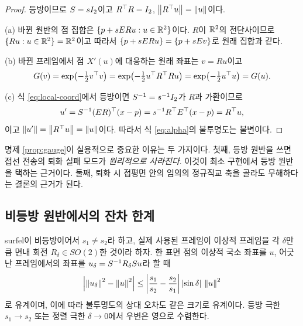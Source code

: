 \begin{proof}
등방이므로 $S = sI_2$이고 $R^{\top} R = I_2$, $\left\lVert R^{\top} u \right\rVert=\left\lVert u \right\rVert$이다.

(a) 바뀐 원반의 점 집합은 $\{p + sE R u : u\in\mathbb{R}^2\}$이다. $R$이
$\mathbb{R}^2$의 전단사이므로 $\{Ru : u\in\mathbb{R}^2\} = \mathbb{R}^2$이고 따라서
$\{p+sE Ru\} = \{p+sE v\}$로 원래 집합과 같다.

(b) 바뀐 프레임에서 점 $X'(u)$에 대응하는 원래 좌표는 $v = Ru$이고
\[
  G(v) = \exp\bigl(-\tfrac12 v^{\top} v\bigr)
  = \exp\bigl(-\tfrac12 u^{\top} R^{\top} R u\bigr)
  = \exp\bigl(-\tfrac12 u^{\top} u\bigr) = G(u).
\]

(c) 식 \eqref{eq:local-coord}에서 등방이면 $S^{-1}=s^{-1}I_2$가 $R$과 가환이므로
\[
  u' = S^{-1}(E R)^{\top}(x-p)
     = s^{-1}R^{\top} E^{\top}(x-p) = R^{\top} u,
\]
이고 $\left\lVert u' \right\rVert=\left\lVert R^{\top} u \right\rVert=\left\lVert u \right\rVert$이다. 따라서 식 \eqref{eq:alpha}의
불투명도는 불변이다.
\end{proof}

명제 \ref{prop:gauge}이 실용적으로 중요한 이유는 두 가지이다. 첫째, 등방 원반을 쓰면
접선 전송의 퇴화 실패 모드가 \emph{원리적으로 사라진다}. 이것이 최소 구현에서 등방
원반을 택하는 근거이다. 둘째, 퇴화 시 접평면 안의 임의의 정규직교 축을 골라도
무해하다는 결론의 근거가 된다.

\subsection{비등방 원반에서의 잔차 한계}

\begin{proposition}
\label{prop:aniso}
surfel이 비등방이어서 $s_1\ne s_2$라 하고, 실제 사용된 프레임이 이상적 프레임을 각
$\delta$만큼 면내 회전 $R_\delta\in SO(2)$한 것이라 하자. 한 표면 점의 이상적 국소
좌표를 $u$, 어긋난 프레임에서의 좌표를 $u_\delta = S^{-1}R_\delta S u$라
할 때
\begin{equation}
  \Bigl\lvert \left\lVert u_\delta \right\rVert^2 - \left\lVert u \right\rVert^2 \Bigr\rvert
  \le \left\lvert \frac{s_1}{s_2}-\frac{s_2}{s_1}\right\rvert \left\lvert \sin\delta \right\rvert\,\left\lVert u \right\rVert^2
  \label{eq:aniso-bound}
\end{equation}
로 유계이며, 이에 따라 불투명도의 상대 오차도 같은 크기로 유계이다. 등방 극한
$s_1\to s_2$ 또는 정렬 극한 $\delta\to0$에서 우변은 영으로 수렴한다.
\end{proposition}

